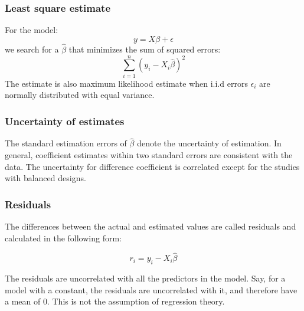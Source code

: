 \documentclass{article}
\begin{document}
\subsubsection*{Least square estimate}
For the model:
\begin{equation}
y = X\beta + \epsilon
\end{equation}
\indent
we search for a $\hat{\beta}$ that minimizes the sum of squared errors:
\begin{equation}
\sum_{i=1}^{n}(y_i - X_i \hat{\beta})^2
\end{equation}
\indent
The estimate is also maximum likelihood estimate when i.i.d errors $\epsilon_i$ are normally distributed with equal variance.

\subsubsection*{Uncertainty of estimates}
The standard estimation errors of $\hat{\beta}$ denote the uncertainty of estimation. In general, coefficient estimates within two standard errors are consistent with the data. The uncertainty for difference coefficient is correlated except for the studies with balanced designs.
	
\subsubsection*{Residuals}
The differences between the actual and estimated values are called residuals and calculated in the following form:

\begin{equation}
r_i = y_i - X_i\hat{\beta}
\end{equation}

The residuals are uncorrelated with all the predictors in the model. Say, for a model with a constant, the residuals are uncorrelated with it, and therefore have a mean of 0. This is not the assumption of regression theory.
\end{document}
